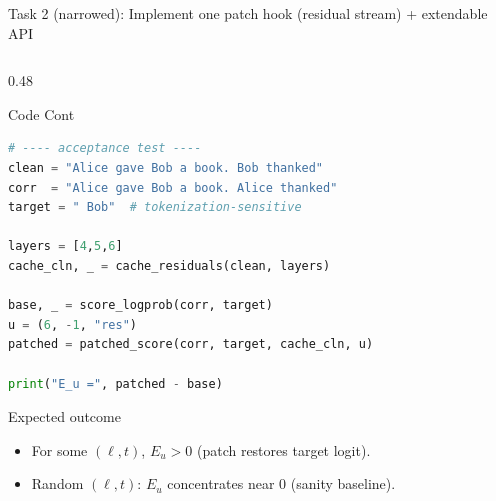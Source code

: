 \documentclass[aspectratio=169,xcolor={dvipsnames}]{beamer}
\begin{document}
\begin{frame}[fragile,shrink=48]{Task 2 (narrowed): Implement one patch hook (residual stream) + extendable API}
\begin{columns}[T,onlytextwidth]
\begin{column}{0.48\textwidth}
\begin{block}{Code Cont}
\begin{lstlisting}[language=Python,basicstyle=\ttfamily\scriptsize]
# ---- acceptance test ----
clean = "Alice gave Bob a book. Bob thanked"
corr  = "Alice gave Bob a book. Alice thanked"
target = " Bob"  # tokenization-sensitive

layers = [4,5,6]
cache_cln, _ = cache_residuals(clean, layers)

base, _ = score_logprob(corr, target)
u = (6, -1, "res")
patched = patched_score(corr, target, cache_cln, u)

print("E_u =", patched - base)
\end{lstlisting}
\end{block}

\vspace{1mm}
\begin{block}{Expected outcome}
\footnotesize
\begin{itemize}\setlength\itemsep{2pt}
\item For some $(\ell,t)$, $E_u>0$ (patch restores target logit).
\item Random $(\ell,t)$: $E_u$ concentrates near $0$ (sanity baseline).
\end{itemize}
\end{block}
\end{column}
\end{columns}
\end{frame}
\end{document}
